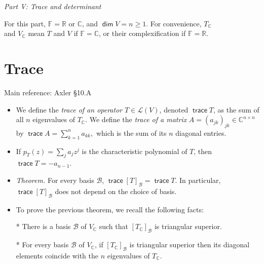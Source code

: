 \documentclass[11pt]{article}
\newcommand{\1}{\mathbf{1}}
\newcommand{\0}{\mathbf{0}}
\newcommand{\B}{\mathcal{B}}
\newcommand{\C}{\mathbb{C}}
\newcommand{\F}{\mathbb{F}}
\newcommand{\cL}{\mathcal{L}}
\newcommand{\R}{\mathbb{R}}
\DeclareMathOperator{\mydim}{\mathsf{dim}}
\DeclareMathOperator{\mytrace}{\mathsf{trace}}
\renewcommand{\geq}{\geqslant}
\begin{document}
{%


\clearpage

\hfil
\emph{\Large Part V: Trace and determinant}

\bigskip

\hfill
For this part,
$\F=\R \text{ or } \C$, and $\mydim V = n \geq 1$.
For convenience, $T_\C$
\\
\hspace*{\fill}
and $V_\C$
mean $T$ and $V$ if $\F=\C$, or
their
complexification if $\F=\R$.

\section{Trace}

Main reference:
Axler \S10.A

\begin{itemize}

\item

We define the \emph{trace of an operator} $T \in \cL(V)$, denoted $\mytrace T$, as the sum of all $n$ eigenvalues of $T_\C$.
We define the \emph{trace of a matrix} $A = (a_{jk})_{jk} \in \C^{n \times n}$ by
\(
\mytrace A = \sum_{k=1}^n a_{kk}
,
\)
which is the sum of its $n$ diagonal entries.

\item

If $ p_T(z) = \sum_j a_j z^j $ is the characteristic polynomial of $ T $, then $ \mytrace T = -a_{n-1} $.

\item

\emph{Theorem.} For every basis $\B$,
\(
\mytrace [T]_\B = \mytrace T
.
\)
In particular, $\mytrace [T]_\B$ does not depend on the choice of basis.

\item

To prove the previous theorem, we recall the following facts:

* There is a basis $\B$ of $V_\C$ such that $[T_\C]_\B$ is triangular superior.

* For every basis $\B$ of $V_\C$, if $[T_\C]_\B$ is triangular superior then its diagonal elements coincide with the $n$ eigenvalues of $T_\C$.


\end{itemize}}
\end{document}
